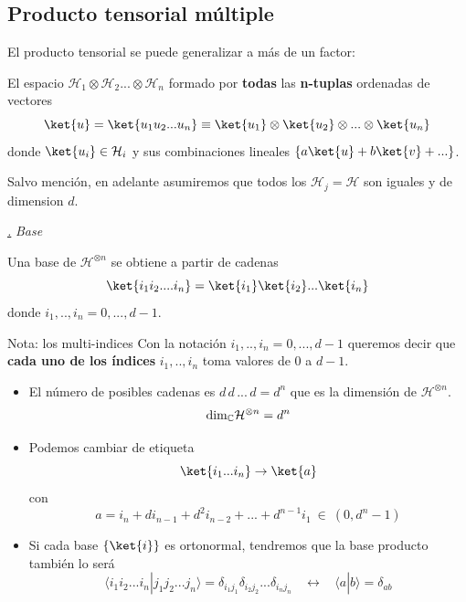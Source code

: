 \documentclass[a4paper,11pt]{book} %
\numberwithin{equation}{chapter}
\newcommand{\braket}[2]{\langle #1|#2\rangle}
\def\subsubiContadorIt{\par\addtocounter{subsubsection}{1}\underline{\it\thesubsubsection.}\hskip0.5cm \setcounter{subsubsubsectionIt}{0}}
\newcommand{\SubsubiIt}[1]{
		\subsubiContadorIt \textit{#1}
	}
\newcounter{subsubsubsectionIt}[subsubsection]
\begin{document}
		\subsection{Producto tensorial múltiple}

El producto tensorial se puede generalizar a más de un factor:

\begin{mybox_gray2}{}
El espacio $\mathcal{H}_1\otimes \mathcal{H}_2 ... \otimes \mathcal{H}_n$ formado por \textbf{todas} las \textbf{n-tuplas} ordenadas de vectores 
	\begin{equation}
	\ket{u} = \ket{u_1u_2...u_n} \equiv\ket{u_1}\otimes\ket{u_2}\otimes ...\otimes \ket{u_n}
	\end{equation}
donde $\ket{u_i}\in \mathcal{H}_i$ y sus combinaciones lineales $\{ a\ket{u}+ b\ket{v} + ...\}$.
\end{mybox_gray2}

Salvo mención, en adelante asumiremos que todos los $\mathcal{H}_j=\mathcal{H}$ son iguales y de dimension $d$.


			\SubsubiIt{Base}

\begin{mybox_gray2}{}
Una base de $\mathcal{H}^{\otimes n}$ se obtiene a partir de cadenas 
	\begin{equation}
	\ket{i_1 i_2.... i_n} = 
\ket{i_1}\ket{i_2}  ... \ket{i_n}
	\end{equation} 
donde $i_1,..,i_n=0,...,d-1$. 
\end{mybox_gray2}

	\begin{mybox_blue}{Nota: los multi-indices}
	Con la notación $i_1,..,i_n=0,...,d-1$ queremos decir que \textbf{cada uno de los índices} $i_1,..,i_n$ toma valores de $0$ a $d-1$.
	\end{mybox_blue}

\begin{itemize}
	\item El número de posibles cadenas es $d\, d\, ... \, d = d^n$ que  es la dimensión de $\mathcal{H}^{\otimes n}$.
	\begin{equation}
	{\rm dim}_{\mathbb C} \mathcal{H}^{\otimes n} = d^n
	\end{equation}

	
	\item Podemos cambiar de etiqueta
		\begin{equation}
	 	\ket{i_1...i_n} \to \ket{a}
	 	\end{equation} 
	con
	\begin{equation}
	a = i_n + d i_{n-1} + d^2 i_{n-2}+...+d^{n-1} i_1~\in ~(0,d^n-1)
	\end{equation}

	
	\item Si cada base $\{\ket{i}\}$ es ortonormal, tendremos que la base producto también lo será
		\begin{equation}
		\braket{i_1 i_2... i_n}{j_1j_2...j_n} = \delta_{i_1j_1}\delta_{i_2j_2}...\delta_{i_nj_n} ~~~~\leftrightarrow ~~~~
\braket{a}{b} = \delta_{ab}
		\end{equation}
\end{itemize}
\end{document}
